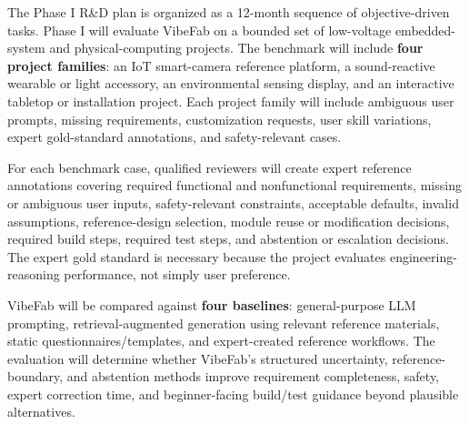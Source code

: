 The Phase I R\&D plan is organized as a 12-month sequence of objective-driven tasks. 
Phase I will evaluate VibeFab on a bounded set of low-voltage embedded-system and physical-computing projects. The benchmark will include \textbf{four project families}: an IoT smart-camera reference platform, a sound-reactive wearable or light accessory, an environmental sensing display, and an interactive tabletop or installation project. Each project family will include ambiguous user prompts, missing requirements, customization requests, user skill variations, expert gold-standard annotations, and safety-relevant cases.

For each benchmark case, qualified reviewers will create expert reference annotations covering required functional and nonfunctional requirements, missing or ambiguous user inputs, safety-relevant constraints, acceptable defaults, invalid assumptions, reference-design selection, module reuse or modification decisions, required build steps, required test steps, and abstention or escalation decisions. The expert gold standard is necessary because the project evaluates engineering-reasoning performance, not simply user preference.

VibeFab will be compared against \textbf{four baselines}: general-purpose LLM prompting, retrieval-augmented generation using relevant reference materials, static questionnaires/templates, and expert-created reference workflows. The evaluation will determine whether VibeFab's structured uncertainty, reference-boundary, and abstention methods improve requirement completeness, safety, expert correction time, and beginner-facing build/test guidance beyond plausible alternatives.

